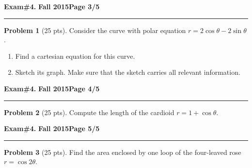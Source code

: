 \documentclass[12pt]{article}
\theoremstyle{definition}
\newtheorem{problem}{Problem}
\begin{document}
\newpage

\hfill{\large\bf Exam\#4.}\hfill{\large\bf
  Fall 2015}\hfill{\large\bf Page 3/5}\hrule

\bigskip

\begin{problem}[25 pts]
Consider the curve with polar equation $r=2\cos \theta - 2 \sin \theta$.
\begin{enumerate}
\item Find a cartesian equation for this curve.
\item Sketch its graph.  Make sure that the sketch carries all relevant information.
\end{enumerate}
\end{problem}
\newpage

\hfill{\large\bf Exam\#4.}\hfill{\large\bf
  Fall 2015}\hfill{\large\bf Page 4/5}\hrule

\bigskip
\begin{problem}[25 pts]
Compute the length of the cardioid $r=1+\cos \theta$.
\end{problem}
\newpage

\hfill{\large\bf Exam\#4.}\hfill{\large\bf
  Fall 2015}\hfill{\large\bf Page 5/5}\hrule
\bigskip

\begin{problem}[25 pts]
Find the area enclosed by one loop of the four-leaved rose $r = \cos 2\theta$.
\end{problem}
\end{document}
